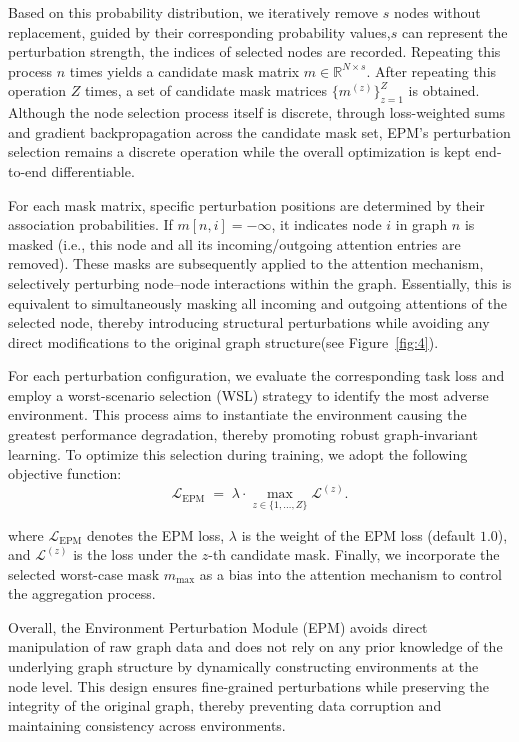 \documentclass[a4paper,fleqn]{cas-dc}
\begin{document}
Based on this probability distribution, we iteratively remove \(s\) nodes without replacement, guided by their corresponding probability values,\(s\) can represent the perturbation strength, the indices of selected nodes are recorded. Repeating this process \(n\) times yields a candidate mask matrix \(m\in\mathbb{R}^{N\times s}\). After repeating this operation \(Z\) times, a set of candidate mask matrices \(\{m^{(z)}\}_{z=1}^Z\) is obtained. {\color{blue}Although the node selection process itself is discrete, through loss-weighted sums and gradient backpropagation across the candidate mask set, EPM's perturbation selection remains a discrete operation while the overall optimization is kept end-to-end differentiable.}

For each mask matrix, specific perturbation positions are determined by their association probabilities. If \(m[n,i]=- \infty\), it indicates node \(i\) in graph \(n\) is masked (i.e., this node and all its incoming/outgoing attention entries are removed). These masks are subsequently applied to the attention mechanism, selectively perturbing node–node interactions within the graph. {\color{blue}Essentially, this is equivalent to simultaneously masking all incoming and outgoing attentions of the selected node, thereby introducing structural perturbations while avoiding any direct modifications to the original graph structure(see Figure~\ref{fig:4}).}



For each perturbation configuration, we evaluate the corresponding task loss and employ a worst-scenario selection (WSL) strategy \cite{liao2019worst} to identify the most adverse environment. This process aims to instantiate the environment causing the greatest performance degradation, thereby promoting robust graph-invariant learning. To optimize this selection during training, we adopt the following objective function:
\[
\mathcal{L}_{\mathrm{EPM}} \;=\; \lambda \cdot \max_{z \in \{1, \ldots, Z\}} \mathcal{L}^{(z)}. \tag{3}
\]

where \(\mathcal{L}_{\mathrm{EPM}}\) denotes the EPM loss, \(\lambda\) is the weight of the EPM loss (default \(1.0\)), and \(\mathcal{L}^{(z)}\) is the loss under the \(z\)-th candidate mask. Finally, we incorporate the selected worst-case mask \(m_{\max}\) as a bias into the attention mechanism to control the aggregation process.

Overall, the Environment Perturbation Module (EPM) avoids direct manipulation of raw graph data and does not rely on any prior knowledge of the underlying graph structure by dynamically constructing environments at the node level. This design ensures fine-grained perturbations while preserving the integrity of the original graph, thereby preventing data corruption and maintaining consistency across environments.
\end{document}
